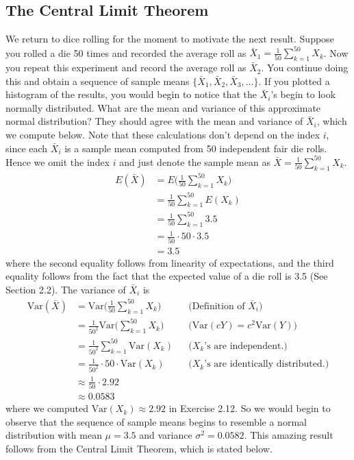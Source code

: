 \documentclass[11pt,letterpaper]{article}
\newcommand\var{\text{Var}}
\numberwithin{theorem}{section}
\numberwithin{definition}{section}
\numberwithin{lemma}{section}
\numberwithin{corollary}{section}
\numberwithin{proposition}{section}
\theoremstyle{definition}
\numberwithin{remark}{section}
\numberwithin{claim}{section}
\numberwithin{observation}{section}
\numberwithin{fact}{section}
\numberwithin{assumption}{section}
\numberwithin{example}{section}
\numberwithin{exercise}{section}
\begin{document}
\newpage
\subsection{The Central Limit Theorem}
We return to dice rolling for the moment to motivate the next result. Suppose you rolled a die 50 times and recorded the average roll as $\bar{X}_1 = \frac{1}{50}\sum_{k=1}^{50}X_k$. Now you repeat this experiment and record the average roll as $\bar{X}_2$. You continue doing this and obtain a sequence of sample means $\{\bar{X}_1,\bar{X}_2,\bar{X}_3,\dots\}$. If you plotted a histogram of the results, you would begin to notice that the $\bar{X}_i$'s begin to look normally distributed. What are the mean and variance of this approximate normal distribution? They should agree with the mean and variance of $\bar{X}_i$, which we compute below. Note that these calculations don't depend on the index $i$, since each $\bar{X}_i$ is a sample mean computed from 50 independent fair die rolls. Hence we omit the index $i$ and just denote the sample mean as $\bar{X} = \frac{1}{50} \sum_{k=1}^{50} X_k$.
\begin{align*}
E(\bar{X}) &= E\Big( \frac{1}{50} \sum_{k=1}^{50}X_k\Big) \\
&= \frac{1}{50}\sum_{k=1}^{50} E(X_k) \\
&= \frac{1}{50} \sum_{k=1}^{50} 3.5 \\
&= \frac{1}{50} \cdot 50 \cdot 3.5 \\
&= 3.5
\end{align*}
where the second equality follows from linearity of expectations, and the third equality follows from the fact that the expected value of a die roll is 3.5 (See Section 2.2). The variance of $\bar{X}_i$ is
\begin{align*}
\var(\bar{X}) &= \var\Big(\frac{1}{50} \sum_{k=1}^{50} X_k \Big) &&\text{(Definition of $\bar{X}_i$)}\\
&= \frac{1}{50^2} \var\Big( \sum_{k=1}^{50} X_k\Big) &&\text{($\var(cY) = c^2\var(Y)$)} \\
&= \frac{1}{50^2} \sum_{k=1}^{50} \var(X_k) &&\text{($X_k$'s are independent.)}\\
&= \frac{1}{50^2} \cdot 50 \cdot \var(X_k) &&\text{($X_k$'s are identically distributed.)}\\
&\approx \frac{1}{50} \cdot 2.92 \\
&\approx 0.0583
\end{align*}
where we computed $\var(X_k) \approx 2.92$ in Exercise 2.12. So we would begin to observe that the sequence of sample means begins to resemble a normal distribution with mean $\mu = 3.5$ and variance $\sigma^2 = 0.0582$. This amazing result follows from the Central Limit Theorem, which is stated below.
\end{document}
